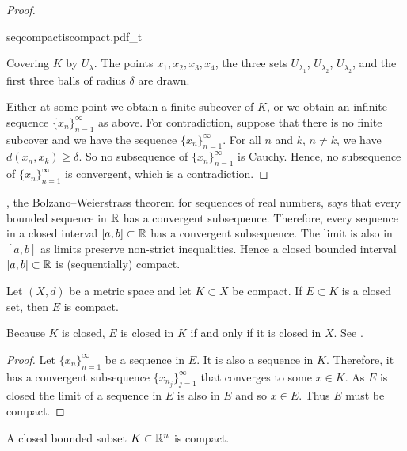 \begin{proof}
\begin{myfigureht}
{seqcompactiscompact.pdf_t}
\caption{Covering $K$ by $U_{\lambda}$.  The points
$x_1,x_2,x_3,x_4$, 
the three sets 
$U_{\lambda_1}$,
$U_{\lambda_2}$,
$U_{\lambda_2}$,
and 
the first three balls
of radius $\delta$ are drawn.\label{fig:seqcompactiscompact}}
\end{myfigureht}

Either at some point we obtain a finite subcover of $K$,
or we obtain an
infinite
sequence $\{ x_n \}_{n=1}^\infty$ as above.
For contradiction, suppose that
there is no finite subcover and we have the sequence $\{ x_n \}_{n=1}^\infty$.
For all $n$ and $k$, $n \not= k$, 
we have $d(x_n,x_k) \geq \delta$.
So no subsequence of $\{ x_n \}_{n=1}^\infty$ is Cauchy.
Hence, no subsequence of $\{ x_n \}_{n=1}^\infty$ is convergent,
which is a contradiction.
\end{proof}

\begin{example} \label{example:intervalcompact}
,
the Bolzano--Weierstrass theorem for sequences of real numbers,
says that every bounded sequence in ${\mathbb{R}}$ has a convergent
subsequence.  Therefore, every sequence in a closed interval $[a,b] \subset {\mathbb{R}}$ has 
a convergent subsequence.  The limit is also in $[a,b]$ as limits
preserve non-strict inequalities.  Hence a closed bounded interval $[a,b]
\subset {\mathbb{R}}$ is (sequentially) compact.
\end{example}

\begin{prop} \label{prop:closedsubsetcompact}
Let $(X,d)$ be a metric space and let $K \subset X$ be compact.  If
$E \subset K$ is a closed set, then $E$ is compact.
\end{prop}

Because $K$ is closed, $E$ is closed in $K$ if
and only if it is closed in $X$.
See .

\begin{proof}
Let $\{ x_n \}_{n=1}^\infty$ be a sequence in $E$.  It is also a sequence in $K$.
Therefore, it has a convergent subsequence $\{ x_{n_j} \}_{j=1}^\infty$ that converges to
some $x \in K$.  As $E$ is closed the limit of a sequence in $E$ is also in $E$
and so $x \in E$.  Thus $E$ must be compact.
\end{proof}

\begin{thm}%
\label{thm:msbw}
A closed bounded subset $K \subset {\mathbb{R}}^n$ is compact.
\end{thm}

